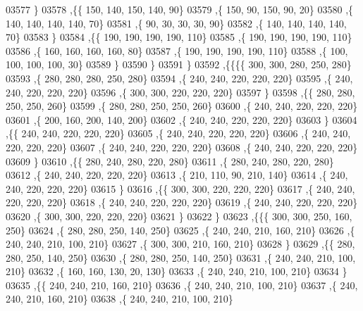 \begin{DoxyCode}
03577     \}
03578    ,\{\{   150,   140,   150,   140,    90\}
03579     ,\{   150,    90,   150,    90,    20\}
03580     ,\{   140,   140,   140,   140,    70\}
03581     ,\{    90,    30,    30,    30,    90\}
03582     ,\{   140,   140,   140,   140,    70\}
03583     \}
03584    ,\{\{   190,   190,   190,   190,   110\}
03585     ,\{   190,   190,   190,   190,   110\}
03586     ,\{   160,   160,   160,   160,    80\}
03587     ,\{   190,   190,   190,   190,   110\}
03588     ,\{   100,   100,   100,   100,    30\}
03589     \}
03590    \}
03591   \}
03592  ,\{\{\{\{   300,   300,   280,   250,   280\}
03593     ,\{   280,   280,   280,   250,   280\}
03594     ,\{   240,   240,   220,   220,   220\}
03595     ,\{   240,   240,   220,   220,   220\}
03596     ,\{   300,   300,   220,   220,   220\}
03597     \}
03598    ,\{\{   280,   280,   250,   250,   260\}
03599     ,\{   280,   280,   250,   250,   260\}
03600     ,\{   240,   240,   220,   220,   220\}
03601     ,\{   200,   160,   200,   140,   200\}
03602     ,\{   240,   240,   220,   220,   220\}
03603     \}
03604    ,\{\{   240,   240,   220,   220,   220\}
03605     ,\{   240,   240,   220,   220,   220\}
03606     ,\{   240,   240,   220,   220,   220\}
03607     ,\{   240,   240,   220,   220,   220\}
03608     ,\{   240,   240,   220,   220,   220\}
03609     \}
03610    ,\{\{   280,   240,   280,   220,   280\}
03611     ,\{   280,   240,   280,   220,   280\}
03612     ,\{   240,   240,   220,   220,   220\}
03613     ,\{   210,   110,    90,   210,   140\}
03614     ,\{   240,   240,   220,   220,   220\}
03615     \}
03616    ,\{\{   300,   300,   220,   220,   220\}
03617     ,\{   240,   240,   220,   220,   220\}
03618     ,\{   240,   240,   220,   220,   220\}
03619     ,\{   240,   240,   220,   220,   220\}
03620     ,\{   300,   300,   220,   220,   220\}
03621     \}
03622    \}
03623   ,\{\{\{   300,   300,   250,   160,   250\}
03624     ,\{   280,   280,   250,   140,   250\}
03625     ,\{   240,   240,   210,   160,   210\}
03626     ,\{   240,   240,   210,   100,   210\}
03627     ,\{   300,   300,   210,   160,   210\}
03628     \}
03629    ,\{\{   280,   280,   250,   140,   250\}
03630     ,\{   280,   280,   250,   140,   250\}
03631     ,\{   240,   240,   210,   100,   210\}
03632     ,\{   160,   160,   130,    20,   130\}
03633     ,\{   240,   240,   210,   100,   210\}
03634     \}
03635    ,\{\{   240,   240,   210,   160,   210\}
03636     ,\{   240,   240,   210,   100,   210\}
03637     ,\{   240,   240,   210,   160,   210\}
03638     ,\{   240,   240,   210,   100,   210\}

\end{DoxyCode}
